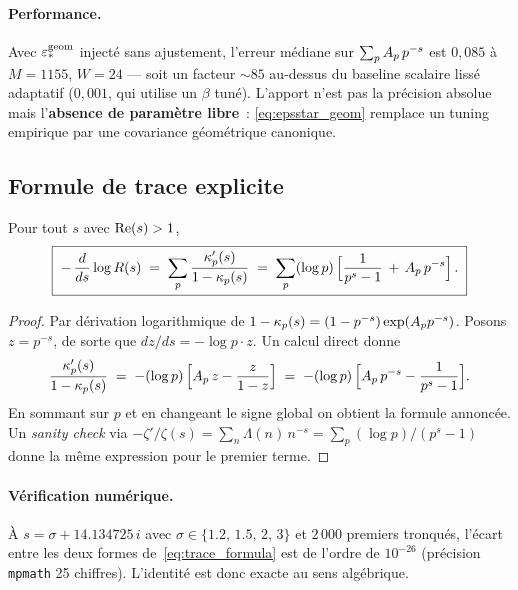 \paragraph{Performance.}
Avec $\varepsilon_{*}^{\mathrm{geom}}$ injecté sans ajustement, l'erreur médiane
sur $\sum_p A_p\,p^{-s}$ est $0{,}085$ à $M = 1155$, $W = 24$ --- soit un
facteur $\sim 85$ au-dessus du baseline scalaire lissé adaptatif
($0{,}001$, qui utilise un $\beta$ tuné). L'apport n'est pas la précision
absolue mais l'\textbf{absence de paramètre libre}~: \eqref{eq:epsstar_geom}
remplace un tuning empirique par une covariance géométrique canonique.

\subsection{Formule de trace explicite}
\label{sec:trace_formula}

\begin{theoreme}
\label{thm:trace_formula}
Pour tout $s$ avec $\operatorname{Re}(s) > 1$,
\begin{equation}
\boxed{\;
-\,\dfrac{d}{ds} \log R(s)
\;=\; \sum_{p} \dfrac{\kappa_p'(s)}{1 - \kappa_p(s)}
\;=\; \sum_{p} (\log p)\,\Big[\dfrac{1}{p^s - 1} \,+\, A_p\,p^{-s}\Big]\,.\;}
\label{eq:trace_formula}
\end{equation}
\end{theoreme}

\begin{proof}
Par dérivation logarithmique de
$1 - \kappa_p(s) = (1 - p^{-s}) \exp(A_p p^{-s})$. Posons $z = p^{-s}$,
de sorte que $dz/ds = -\log p \cdot z$. Un calcul direct donne
\[
\dfrac{\kappa_p'(s)}{1 - \kappa_p(s)}
\;=\; -(\log p)\,\Big[A_p\,z - \dfrac{z}{1 - z}\Big]
\;=\; -(\log p)\,\Big[A_p\,p^{-s} - \dfrac{1}{p^s - 1}\Big].
\]
En sommant sur $p$ et en changeant le signe global on obtient la formule
annoncée. Un \emph{sanity check} via $-\zeta'/\zeta(s) = \sum_n
\Lambda(n)\,n^{-s} = \sum_p (\log p)/(p^s - 1)$ donne la même expression
pour le premier terme.
\end{proof}

\paragraph{Vérification numérique.}
À $s = \sigma + 14.134725\,i$ avec $\sigma \in \{1.2,\,1.5,\,2,\,3\}$ et
$2\,000$ premiers tronqués, l'écart entre les deux formes
de~\eqref{eq:trace_formula} est de l'ordre de $10^{-26}$ (précision
\texttt{mpmath} 25 chiffres). L'identité est donc exacte au sens
algébrique.

